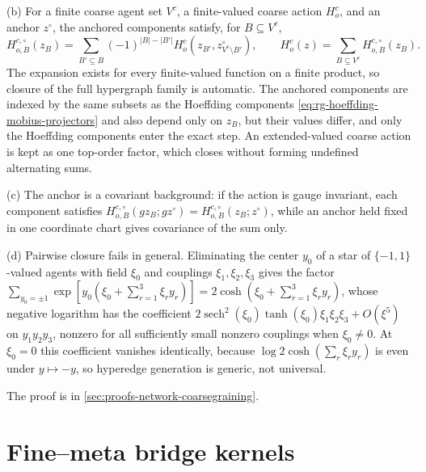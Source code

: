 (b) For a finite coarse agent set $V^c$, a finite-valued coarse action $H_o^c$, and
an anchor $z^\circ$, the anchored components satisfy, for $B\subseteq V^c$,
\begin{equation}
H^{c,\circ}_{o,B}(z_B)
=\sum_{B'\subseteq B}(-1)^{\lvert B\rvert-\lvert B'\rvert}
H_o^c(z_{B'},z^\circ_{V^c\setminus B'}),
\qquad
H_o^c(z)=\sum_{B\subseteq V^c}H^{c,\circ}_{o,B}(z_B).
\label{eq:rg-mobius-potentials}
\end{equation}
The expansion exists for every finite-valued function on a finite product, so
closure of the full hypergraph family is automatic. The anchored components are indexed by the same subsets as the
Hoeffding components \eqref{eq:rg-hoeffding-mobius-projectors} and also depend only
on $z_B$, but their values differ, and only the Hoeffding components enter the
exact step. An extended-valued coarse action is kept as one top-order factor, which
closes without forming undefined alternating sums.

(c) The anchor is a covariant background: if the action is gauge invariant, each
component satisfies $H^{c,\circ}_{o,B}(gz_B;gz^\circ)=H^{c,\circ}_{o,B}(z_B;z^\circ)$,
while an anchor held fixed in one coordinate chart gives covariance of the sum
only.

(d) Pairwise closure fails in general. Eliminating the center $y_0$ of a star of
$\{-1,1\}$-valued agents with field $\xi_0$ and couplings $\xi_1,\xi_2,\xi_3$ gives
the factor $\sum_{y_0=\pm1}\exp[y_0(\xi_0+\sum_{r=1}^3\xi_ry_r)]
=2\cosh(\xi_0+\sum_{r=1}^3\xi_ry_r)$, whose negative logarithm has the coefficient
$2\operatorname{sech}^2(\xi_0)\tanh(\xi_0)\xi_1\xi_2\xi_3+O(\xi^5)$ on $y_1y_2y_3$,
nonzero for all sufficiently small nonzero couplings when $\xi_0\ne0$. At
$\xi_0=0$ this coefficient vanishes identically, because
$\log2\cosh(\sum_r\xi_ry_r)$ is even under $y\mapsto-y$, so hyperedge generation is
generic, not universal. 

The proof is in \cref{sec:proofs-network-coarsegraining}.

\section{Fine--meta bridge kernels}
\label{sec:rg-cross-scale-kernels}

